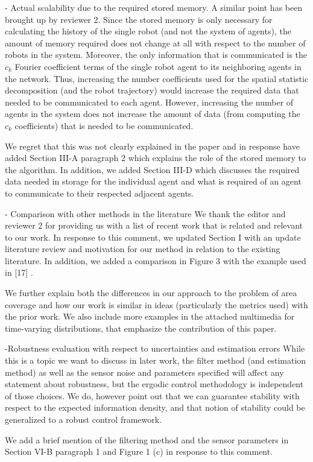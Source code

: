 \documentclass[10pt]{article}
\begin{document}
\begin{response}{
- Actual scalability due to the required stored memory.
}
A similar point has been brought up by reviewer 2. 
Since the stored memory is only necessary for calculating the history of the single robot (and not the system of agents), the amount of memory required does not change at all with respect to the number of robots in the system.
Moreover, the only information that is communicated is the $c_k$ Fourier coefficient terms of the single robot agent to its neighboring agents in the network.
Thus, increasing the number coefficients used for the spatial statistic decomposition (and the robot trajectory) would increase the required data that needed to be communicated to each agent.
However, increasing the number of agents in the system does not increase the amount of data (from computing the $c_k$ coefficients) that is needed to be communicated. 

We regret that this was not clearly explained in the paper and in response have added Section III-A paragraph 2 which explains the role of the stored memory to the algorithm.
In addition, we added Section III-D which discusses the required data needed in storage for the individual agent and what is required of an agent to communicate to their respected adjacent agents.
\end{response}

\begin{response}{
- Comparison with other methods in the literature
}
We thank the editor and reviewer 2 for providing us with a list of recent work that is related and relevant to our work. 
In response to this comment, we updated Section I with an update literature review and motivation for our method in relation to the existing literature.
In addition, we added a comparison in Figure 3 with the example used in [17] . 

We further explain both the differences in our approach to the problem of area coverage and how our work is similar in ideas (particularly the metrics used) with the prior work. 
We also include more examples in the attached multimedia for time-varying distributions, that emphasize the contribution of this paper.
\end{response}

\begin{response}{
-Robustness evaluation with respect to uncertainties and estimation errors}
While this is a topic we want to discuss in later work, the filter method (and estimation method) as well as the sensor noise and parameters specified will affect any statement about robustness, but the ergodic control methodology is independent of those choices.
We do, however point out that we can guarantee stability with respect to the expected information density, and that notion of stability could be generalized to a robust control framework.

We add a brief mention of the filtering method and the sensor parameters in Section VI-B paragraph 1 and Figure 1 (c) in response to this comment.
\end{response}
\end{document}
